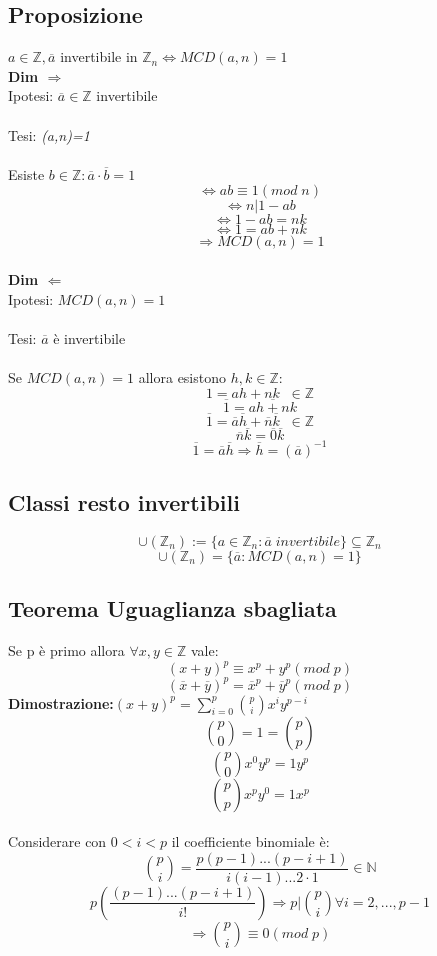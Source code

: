 \subsection{Proposizione}
\(a\in\mathbb{Z}, \overline{a}\) invertibile in \(\mathbb{Z}_n\Leftrightarrow MCD(a,n)=1\)
\\
\textbf{Dim \(\Rightarrow\)}
\\Ipotesi: \(\overline{a}\in\mathbb{Z}\) invertibile
\\\\Tesi: \textit{(a,n)=1}
\\\\Esiste \(b\in\mathbb{Z}: \overline{a}\cdot\overline{b}=1\) 
\[\Leftrightarrow ab\equiv 1(mod\;n)\]
\[\Leftrightarrow n|1-ab\]
\[\Leftrightarrow  1-ab=nk\]
\[\Leftrightarrow 1=ab+nk\]
\[\Rightarrow MCD(a,n)=1 \]
\\
\textbf{Dim \(\Leftarrow\)} 
\\Ipotesi: \(MCD(a,n)=1\)
\\\\Tesi: \(\overline{a}\) è invertibile
\\\\Se \(MCD(a,n)=1\) allora esistono \(h,k\in\mathbb{Z}:\)
\[1=ah+nk\;\;\in\mathbb{Z}\]
\[\overline{1}=\overline{ah+nk}\]
\[\overline{1}=\overline{a}\overline{h}+\overline{n}\overline{k}\;\;\in\mathbb{Z}\]
\[\overline{n}\overline{k}=\overline{0}\overline{k}\]
\[\overline{1}=\overline{a}\overline{h}\Rightarrow\overline{h}=(\overline{a})^{-1}\]

\subsection{Classi resto invertibili}
\[\cup (\mathbb{Z}_n):=\{a\in\mathbb{Z}_n:\overline{a}\;invertibile\}\subseteq\mathbb{Z}_n\]
\[\cup (\mathbb{Z}_n)=\{\overline{a}: MCD(a,n)=1\}\]

\subsection{Teorema Uguaglianza sbagliata}
Se p è primo allora \(\forall x,y\in\mathbb{Z}\) vale:
\[(x+y)^p\equiv x^p+y^p(mod\;p)\]
\[(\overline{x}+\overline{y})^p=\overline{x}^p+\overline{y}^p(mod\;p)\]
\textbf{Dimostrazione:}\((x+y)^p=\sum ^p_{i=0}\binom{p}{i}x^iy^{p-i}\)
\[\binom{p}{0}=1=\binom{p}{p}\]
\[\binom{p}{0}x^0y^p=1y^p\]
\[\binom{p}{p}x^py^0=1x^p\]
\\
Considerare con \(0<i<p\) il coefficiente binomiale è:
\[\binom{p}{i}=\frac{p(p-1)...(p-i+1)}{i(i-1)...2\cdot 1}\in\mathbb{N}\]
\[p(\frac{(p-1)...(p-i+1)}{i!})\Rightarrow p|\binom{p}{i}\forall i=2,...,p-1\]
\[\Rightarrow\binom{p}{i}\equiv 0(mod\;p)\]

